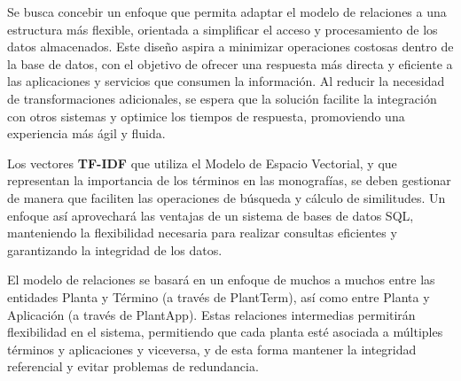 

Se busca concebir un enfoque que permita adaptar el modelo de relaciones a una estructura más flexible, orientada a simplificar el acceso y procesamiento de los datos almacenados. 
Este diseño aspira a minimizar operaciones costosas dentro de la base de datos, con el objetivo de ofrecer una respuesta más directa y eficiente a las aplicaciones y servicios que 
consumen la información. Al reducir la necesidad de transformaciones adicionales, se espera que la solución facilite la integración con otros sistemas y optimice los tiempos de respuesta, 
promoviendo una experiencia más ágil y fluida.


Los vectores \textbf{TF-IDF} que utiliza el Modelo de Espacio Vectorial, y que representan la importancia de los términos en las monografías, se deben gestionar de manera que 
faciliten las operaciones de búsqueda y cálculo de similitudes. Un enfoque así aprovechará las ventajas de un sistema de bases de datos SQL, manteniendo la flexibilidad necesaria 
para realizar consultas eficientes y garantizando la integridad de los datos.

El modelo de relaciones se basará en un enfoque de muchos a muchos entre las entidades Planta y Término (a través de PlantTerm), así como entre Planta y Aplicación (a través de PlantApp). 
Estas relaciones intermedias permitirán flexibilidad en el sistema, permitiendo que cada planta esté asociada a múltiples términos y aplicaciones y viceversa, y de esta forma mantener la integridad 
referencial y evitar problemas de redundancia. 

